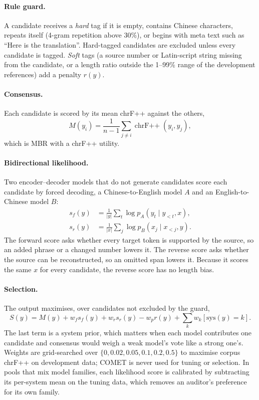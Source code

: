 \documentclass[11pt]{article}
\begin{document}
\paragraph{Rule guard.}
A candidate receives a \emph{hard} tag if it is empty, contains Chinese characters, repeats itself (4-gram repetition above 30\%), or begins with meta text such as ``Here is the translation''. Hard-tagged candidates are excluded unless every candidate is tagged. \emph{Soft} tags (a source number or Latin-script string missing from the candidate, or a length ratio outside the 1--99\% range of the development references) add a penalty $r(y)$.

\paragraph{Consensus.}
Each candidate is scored by its mean chrF++ against the others,
\begin{equation}
M(y_i)=\frac{1}{n-1}\sum_{j\ne i}\operatorname{chrF++}(y_i,y_j),
\label{eq:consensus}
\end{equation}
which is MBR with a chrF++ utility.

\paragraph{Bidirectional likelihood.}
Two encoder--decoder models that do not generate candidates score each candidate by forced decoding, a Chinese-to-English model $A$ and an English-to-Chinese model $B$:
\begin{align*}
s_f(y)&=\tfrac{1}{|y|}\textstyle\sum_{t}\log p_A(y_t\mid y_{<t},x),\\
s_r(y)&=\tfrac{1}{|x|}\textstyle\sum_{j}\log p_B(x_j\mid x_{<j},y).
\end{align*}
The forward score asks whether every target token is supported by the source, so an added phrase or a changed number lowers it. The reverse score asks whether the source can be reconstructed, so an omitted span lowers it. Because it scores the same $x$ for every candidate, the reverse score has no length bias.

\paragraph{Selection.}
The output maximises, over candidates not excluded by the guard,
\[
S(y)=M(y)+w_f s_f(y)+w_r s_r(y)-w_p r(y)+\textstyle\sum_k w_k[\mathrm{sys}(y)=k].
\]
The last term is a system prior, which matters when each model contributes one candidate and consensus would weigh a weak model's vote like a strong one's. Weights are grid-searched over $\{0,0.02,0.05,0.1,0.2,0.5\}$ to maximise corpus chrF++ on development data; COMET is never used for tuning or selection. In pools that mix model families, each likelihood score is calibrated by subtracting its per-system mean on the tuning data, which removes an auditor's preference for its own family.
\end{document}
